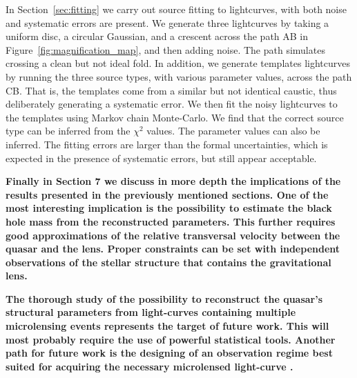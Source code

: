 In Section~\ref{sec:fitting} we carry out source fitting to
lightcurves, with both noise and systematic errors are present.  We
generate three lightcurves by taking a uniform disc, a circular
Gaussian, and a crescent across the path AB in
Figure~\ref{fig:magnification_map}, and then adding noise.  The path
simulates crossing a clean but not ideal fold.  In addition, we
generate templates lightcurves by running the three source types, with
various parameter values, across the path CB.  That is, the templates
come from a similar but not identical caustic, thus deliberately
generating a systematic error.  We then fit the noisy lightcurves to
the templates using Markov chain Monte-Carlo.  We find that the
correct source type can be inferred from the $\chi^2$ values.  The
parameter values can also be inferred. The fitting errors are larger
than the formal uncertainties, which is expected in the presence of
systematic errors, but still appear acceptable.

\textbf{Finally in Section 7 we discuss in more depth the 
implications of the results presented in the previously mentioned sections.
One of the most interesting implication is the possibility to estimate the black hole
mass from the reconstructed parameters. This further requires good approximations of the 
relative transversal velocity between the quasar and the lens. Proper constraints can be set
with independent observations of the stellar structure that contains the gravitational lens.}

\textbf{The thorough study of the possibility to reconstruct the quasar's structural 
parameters from light-curves containing multiple microlensing events represents 
the target of future work. This will most probably require the use of powerful
statistical tools. Another path for future work is the designing of an observation regime 
best suited for acquiring the necessary microlensed light-curve .    }
